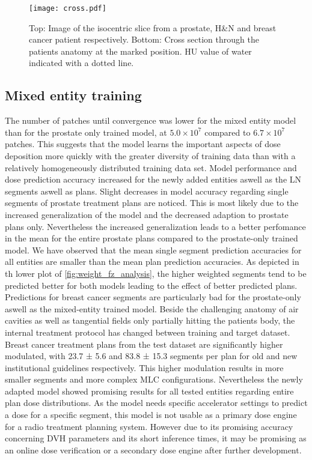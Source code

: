 \begin{figure}
    \centering
    \texttt{[image: cross.pdf]}
    \caption{
        Top: Image of the isocentric slice from a prostate, H\&N and breast cancer patient respectively. 
        Bottom: Cross section through the patients anatomy at the marked position.
        HU value of water indicated with a dotted line.}\label{fig:crosssection}
\end{figure}

\subsection{Mixed entity training}

The number of patches until convergence was lower for the mixed entity model than for the prostate only trained model, at $5.0 \times 10^7$ compared to $6.7 \times 10^7$ patches.
This suggests that the model learns the important aspects of dose deposition more quickly with the greater diversity of training data than with a relatively homogeneously distributed training data set. 
Model performance and dose prediction accuracy increased for the newly added entities aswell as the \acs{LN} segments aswell as plans. 
Slight decreases in model accuracy regarding single segments of prostate treatment plans are noticed. 
This is most likely due to the increased generalization of the model and the decreased adaption to prostate plans only.
Nevertheless the increased generalization leads to a better perfomance in the mean for the entire prostate plans compared to the prostate-only trained model.
We have observed that the mean single segment prediction accuracies for all entities are smaller than the mean plan prediction accuracies.
As depicted in th lower plot of \autoref{fig:weight_fz_analysis}, the higher weighted segments tend to be predicted better for both models leading to the effect of better predicted plans.\\
Predictions for breast cancer segments are particularly bad for the prostate-only aswell as the mixed-entity trained model. 
Beside the challenging anatomy of air cavities as well as tangential fields only partially hitting the patients body, the internal treatment protocol has changed between training and target dataset. 
Breast cancer treatment plans from the test dataset are significantly higher modulated, with 23.7 ± 5.6 and 83.8 ± 15.3 segments per plan for old and new institutional guidelines respectively. 
This higher modulation results in more smaller segments and more complex \acs{MLC} configurations.
Nevertheless the newly adapted model showed promising results for all tested entities regarding entire plan dose distributions.
As the model needs specific accelerator settings to predict a dose for a specific segment, this model is not usable as a primary dose engine for a radio treatment planning system.
However due to its promising accuracy concerning DVH parameters and its short inference times, it may be promising as an online dose verification or a secondary dose engine after further development.

